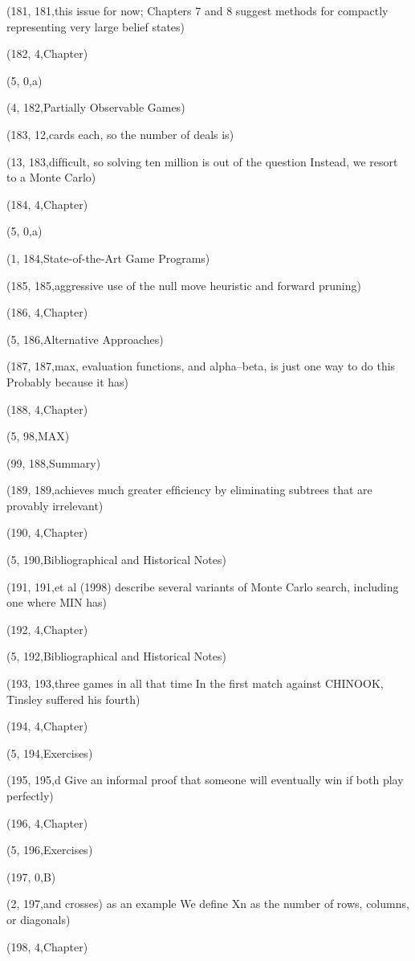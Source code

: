 (181, 181,this issue for now; Chapters 7 and 8 suggest methods for compactly representing very large belief states)

(182, 4,Chapter)

(5, 0,a)

(4, 182,Partially Observable Games)

(183, 12,cards each, so the number of deals is)

(13, 183,difﬁcult, so solving ten million is out of the question Instead, we resort to a Monte Carlo)

(184, 4,Chapter)

(5, 0,a)

(1, 184,State-of-the-Art Game Programs)

(185, 185,aggressive use of the null move heuristic and forward pruning)

(186, 4,Chapter)

(5, 186,Alternative Approaches)

(187, 187,max, evaluation functions, and alpha–beta, is just one way to do this Probably because it has)

(188, 4,Chapter)

(5, 98,MAX)

(99, 188,Summary)

(189, 189,achieves much greater efﬁciency by eliminating subtrees that are provably irrelevant)

(190, 4,Chapter)

(5, 190,Bibliographical and Historical Notes)

(191, 191,et al (1998) describe several variants of Monte Carlo search, including one where MIN has)

(192, 4,Chapter)

(5, 192,Bibliographical and Historical Notes)

(193, 193,three games in all that time In the ﬁrst match against CHINOOK, Tinsley suffered his fourth)

(194, 4,Chapter)

(5, 194,Exercises)

(195, 195,d Give an informal proof that someone will eventually win if both play perfectly)

(196, 4,Chapter)

(5, 196,Exercises)

(197, 0,B)

(2, 197,and crosses) as an example We deﬁne Xn as the number of rows, columns, or diagonals)

(198, 4,Chapter)

